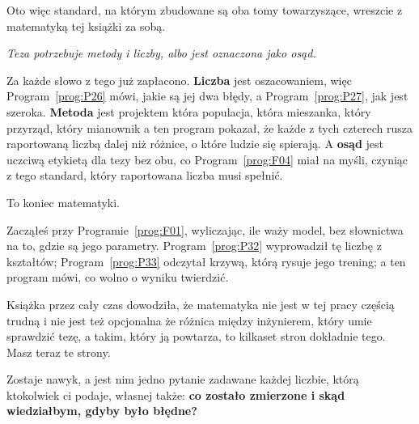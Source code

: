 \begin{fr}
Oto więc standard, na którym zbudowane są oba tomy towarzyszące, wreszcie z
matematyką tej książki za sobą.

\begin{center}
\emph{Teza potrzebuje metody i liczby, albo jest oznaczona jako osąd.}
\end{center}

Za każde słowo z tego już zapłacono. \textbf{Liczba} jest oszacowaniem, więc
Program~\ref{prog:P26} mówi, jakie są jej dwa błędy, a
Program~\ref{prog:P27}, jak jest szeroka. \textbf{Metoda} jest projektem
\dash{} która populacja, która mieszanka, który przyrząd, który mianownik
\dash{} a ten program pokazał, że każde z tych czterech rusza raportowaną
liczbą dalej niż różnice, o które ludzie się spierają. A \textbf{osąd} jest
uczciwą etykietą dla tezy bez obu, co Program~\ref{prog:F04} miał na myśli,
czyniąc z tego standard, który raportowana liczba musi spełnić.
\end{fr}

\begin{fr}
To koniec matematyki.

Zacząłeś przy Programie~\ref{prog:F01}, wyliczając, ile waży model, bez
słownictwa na to, gdzie są jego parametry. Program~\ref{prog:P32} wyprowadził
tę liczbę z kształtów; Program~\ref{prog:P33} odczytał krzywą, którą rysuje
jego trening; a ten program mówi, co wolno o wyniku twierdzić.

Książka przez cały czas dowodziła, że matematyka nie jest w tej pracy częścią
trudną i nie jest też opcjonalna \dash{} że różnica między inżynierem, który
umie sprawdzić tezę, a takim, który ją powtarza, to kilkaset stron dokładnie
tego. Masz teraz te strony.

Zostaje nawyk, a jest nim jedno pytanie zadawane każdej liczbie, którą
ktokolwiek ci podaje, własnej także: \textbf{co zostało zmierzone i skąd
wiedziałbym, gdyby było błędne?}
\end{fr}

